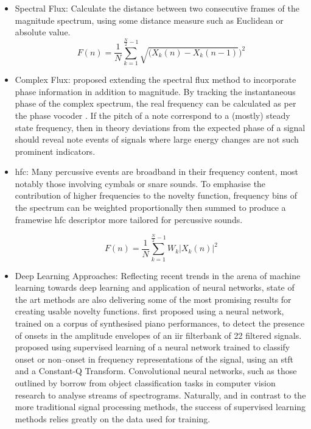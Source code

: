 \begin{itemize}
\item Spectral Flux: Calculate the distance between two consecutive frames of the magnitude spectrum, using some distance measure such as Euclidean or absolute value.
\begin{equation}
\label{eq:Spectral Flux}	
F(n)=\frac{1}{N}\sum_{k=1}^{\frac{N}{2}-1}\sqrt{(X_{k}(n)-X_{k}(n-1)})^{2}
\end{equation}
\item Complex Flux: \citep{Bello2004} proposed extending the spectral flux method to incorporate phase information in addition to magnitude. By tracking the instantaneous phase of the complex spectrum, the real frequency can be calculated as per the phase vocoder \citep{Roads1996}. If the pitch of a note correspond to a (mostly) steady state frequency, then in theory deviations from the expected phase of a signal should reveal note events of signals where large energy changes are not such prominent indicators.
\item \acrfull{hfc}: Many percussive events are broadband in their frequency content, most notably those involving cymbals or snare sounds. To emphasise the contribution of higher frequencies to the novelty function, frequency bins of the spectrum can be weighted proportionally then summed to produce a framewise \acrshort{hfc} descriptor more tailored for percussive sounds.

\begin{equation}
\label{eq:High Frequency Content}	
F(n)=\frac{1}{N}\sum_{k=1}^{\frac{N}{2}-1}W_{k}|X_{k}(n)|^{2}
\end{equation}

\item Deep Learning Approaches: Reflecting recent trends in the arena of machine learning towards deep learning and application of neural networks, state of the art methods are also delivering some of the most promising results for creating usable novelty functions. \cite{Marolt2002} first proposed using a neural network, trained on a corpus of synthesised piano performances, to detect the presence of onsets in the amplitude envelopes of an \acrshort{iir} filterbank of 22 filtered signals.  \cite{Lacoste2007} proposed using supervised learning of a neural network trained to classify onset or non–onset in frequency representations of the signal, using an \acrshort{stft} and a Constant-Q Transform. Convolutional neural networks, such as those outlined by \cite{Schluter2013, Schluter2014} borrow from object classification tasks in computer vision research to analyse streams of spectrograms. Naturally, and in contrast to the more traditional signal processing methods, the success of supervised learning methods relies greatly on the data used for training.
\end{itemize}


